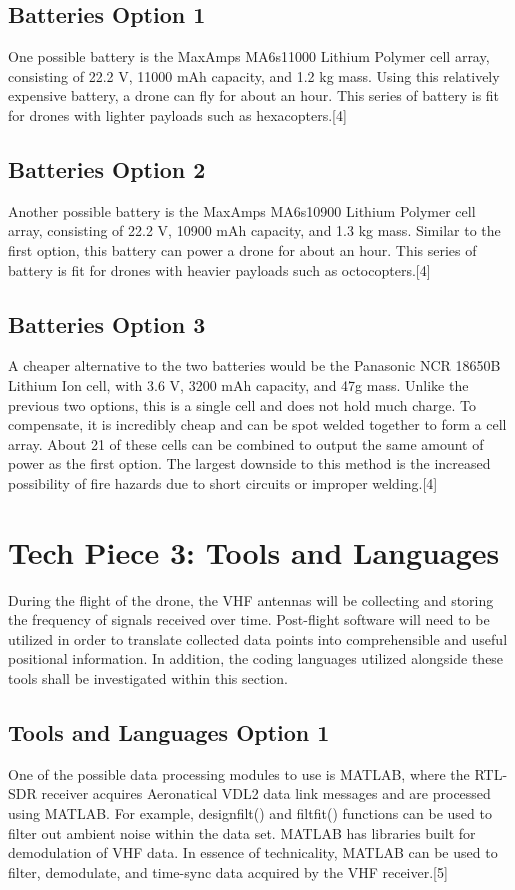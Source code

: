 \documentclass[onecolumn, draftclsnofoot,10pt, compsoc]{IEEEtran}
\begin{document}
\subsection{Batteries Option 1}
One possible battery is the MaxAmps MA6s11000 Lithium Polymer cell array, consisting of 22.2 V, 11000 mAh capacity, and 1.2 kg mass. Using this relatively expensive battery, a drone can fly for about an hour. This series of battery is fit for drones with lighter payloads such as hexacopters.[4]
\subsection{Batteries Option 2}
Another possible battery is the MaxAmps MA6s10900 Lithium Polymer cell array, consisting of 22.2 V, 10900 mAh capacity, and 1.3 kg mass. Similar to the first option, this battery can power a drone for about an hour. This series of battery is fit for drones with heavier payloads such as octocopters.[4]
\subsection{Batteries Option 3}
A cheaper alternative to the two batteries would be the Panasonic NCR 18650B Lithium Ion cell, with 3.6 V, 3200 mAh capacity, and 47g mass. Unlike the previous two options, this is a single cell and does not hold much charge. To compensate, it is incredibly cheap and can be spot welded together to form a cell array. About 21 of these cells can be combined to output the same amount of power as the first option. The largest downside to this method is the increased possibility of fire hazards due to short circuits or improper welding.[4]
\section{Tech Piece 3: Tools and Languages}
During the flight of the drone, the VHF antennas will be collecting and storing the frequency of signals received over time. Post-flight software will need to be utilized in order to translate collected data points into comprehensible and useful positional information. In addition, the coding languages utilized alongside these tools shall be investigated within this section.
\subsection{Tools and Languages Option 1}
One of the possible data processing modules to use is MATLAB, where the RTL-SDR receiver acquires Aeronatical VDL2 data link messages and are processed using MATLAB. For example, designfilt() and filtfit() functions can be used to filter out ambient noise within the data set. MATLAB has libraries built for demodulation of VHF data. In essence of technicality, MATLAB can be used to filter, demodulate, and time-sync data acquired by the VHF receiver.[5]
\end{document}
